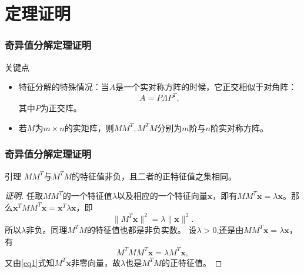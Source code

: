 
\section{定理证明} 


\begin{frame}
\frametitle{奇异值分解定理证明}

\begin{block}{关键点}
\begin{itemize}
\item<2-> 特征分解的特殊情况：当$A$是一个实对称方阵的时候，它正交相似于对角阵：
$$A = P\Lambda P^T,$$
其中$P$为正交阵。
\vspace{1em}
\item<3-> 若$M$为$m\times n$的实矩阵，则$MM^T, M^TM$分别为$m$阶与$n$阶实对称方阵。
\end{itemize}
\end{block}

\end{frame}



\begin{frame}
\frametitle{奇异值分解定理证明}

\begin{block}{引理}
\centering
$MM^T$与$M^TM$的特征值非负，且二者的正特征值之集相同。
\end{block}

\pause

\begin{proof}[证明\nopunct]
任取$MM^T$的一个特征值$\lambda$以及相应的一个特征向量$\mathbf{x}$，即有$MM^T\mathbf{x} = \lambda\mathbf{x}$。那么$\mathbf{x}^TMM^T\mathbf{x} = \mathbf{x}^T\lambda\mathbf{x}$，即
\begin{equation}
\label{eq1}
\lVert M^T\mathbf{x} \rVert^2 = \lambda \lVert \mathbf{x} \rVert^2.
\end{equation}
所以$\lambda$非负。同理$M^TM$的特征值也都是非负实数。\newline\pause
设$\lambda > 0$,还是由$MM^T\mathbf{x} = \lambda\mathbf{x}$，有
\begin{equation}
\label{eq2}
M^TMM^T\mathbf{x} = \lambda M^T\mathbf{x},
\end{equation}
又由\eqref{eq1}式知$M^T\mathbf{x}$非零向量，故$\lambda$也是$M^TM$的正特征值。
\end{proof}

\end{frame}

